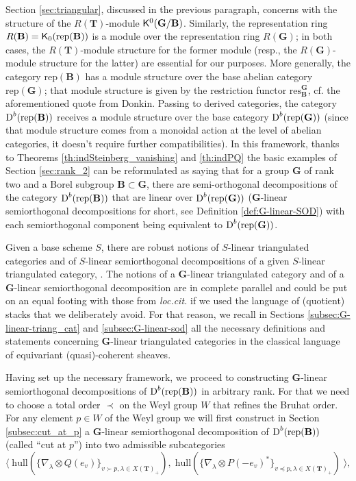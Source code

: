 \documentclass[sn-mathphys-num]{sn-jnl}%
\newcommand{\rep}{{\mathrm{rep}}}
\newcommand{\res}{{\mathrm{res}}}
\newcommand{\hull}{{\mathrm{hull}}}
\newcommand*{\Dd}{\mathop{\mathrm D\kern0pt}\nolimits}
\newcommand{\sK}{{\sf K}}
\newcommand{\bg}{\mathbf G}
\newcommand{\fb}{\mathbf B}
\newcommand{\bt}{\mathbf T}
\theoremstyle{definition}
\begin{document}
Section \ref{sec:triangular}, discussed in the previous paragraph, concerns with the structure of the $R(\bt)$-module ${\sf K}^0(\bg/\fb)$. Similarly, the representation ring $R( \fb)=\sK_0(\rep( \fb))$ is a module over the representation ring $R(\bg)$; in both cases, the $R(\bt)$-module structure for the former module (resp., the $R(\bg)$-module structure for the latter) are essential for our purposes. More generally, the category $\rep( \fb)$ has a module structure over the base abelian category $\rep( \bg)$; that module structure is given by the restriction functor $\res_{\fb}^{ \bg}$,  cf. the aforementioned quote from Donkin. Passing to derived categories, the category $\Dd ^b(\rep( \fb))$ receives a module  structure over the base category $\Dd ^b(\rep( \bg))$ (since that module structure comes from a monoidal action at the level of abelian categories, it doesn't require further compatibilities). In this framework, thanks to Theorems \ref{th:indSteinberg_vanishing} and \ref{th:indPQ} the basic examples of Section \ref{sec:rank_2} can be reformulated as saying that for a group $\bg$ of rank two and a Borel subgroup $\fb\subset \bg$, there are semi-orthogonal decompositions of the category $\Dd ^b(\rep( \fb))$ that are linear over $\Dd ^b(\rep( \bg))$ ($\bg$-linear semiorthogonal decompositions for short, see Definition \ref{def:G-linear-SOD}) with each semiorthogonal component being equivalent to $\Dd ^b(\rep( \bg))$. 

Given a base scheme $S$, there are robust notions of $S$-linear triangulated categories and of $S$-linear semiorthogonal decompositions of a given $S$-linear triangulated category, \cite{Kuzbasech}. The notions of a $\bg$-linear triangulated category and of a $\bg$-linear semiorthogonal decomposition are in complete parallel and could be put on an equal footing with those from {\it loc.cit.} if we used the language of (quotient) stacks that we deliberately avoid. For that reason, we recall in Sections \ref{subsec:G-linear-triang_cat} and \ref{subsec:G-linear-sod} all the necessary definitions and statements concerning $\bg$-linear triangulated categories in the classical language of equivariant (quasi)-coherent sheaves.


Having set up the necessary framework, we proceed to constructing $ \bg$-linear semiorthogonal decompositions of $\Dd ^b(\rep( \fb))$ in arbitrary rank. For that we need to choose a total order $\prec$ on the Weyl group $W$ that refines the Bruhat order. For any element $p\in W$ of the Weyl group we will first construct in Section \ref{subsec:cut_at_p} a $\bg$-linear semiorthogonal decomposition of $\Dd ^b(\rep( \fb))$ (called ``cut at $p$'') into two admissible subcategories 
\begin{equation}\label{eq:p-cutSOD}
\langle\;\hull(\{\nabla_\lambda\otimes Q(e_v)\}_{v\succ p,\lambda\in X( \bt)_+}),\;\hull(\{\nabla_\lambda\otimes P(-e_v)^*\}_{v\preceq p,\lambda\in X( \bt)_+})\;\rangle,
\end{equation}
\end{document}
